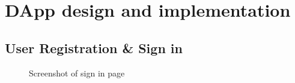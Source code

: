 \chapter{DApp design and implementation} 
\label{chapter:introduction}

\section{User Registration \& Sign in}
\begin{figure}[htb]
    \centering
    \caption{{\footnotesize Screenshot of sign in page}}
    \label{fig:signin}
\end{figure}

